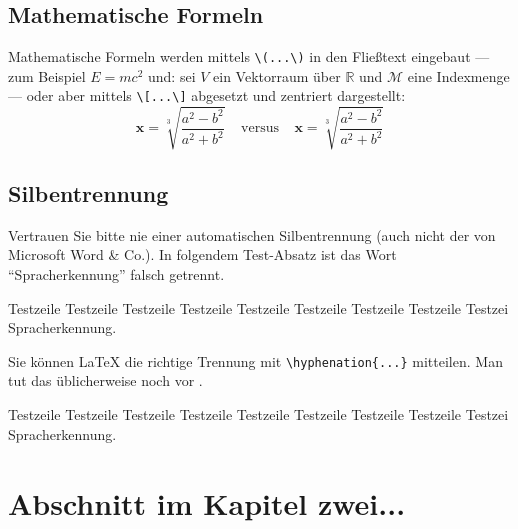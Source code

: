 \subsection{Mathematische Formeln}

Mathematische Formeln werden mittels \verb|\(...\)|
in den Fließtext eingebaut
--- zum Beispiel \( E=mc^2 \) und:
sei \(V\) ein Vektorraum über \(\mathbb{R}\)
und \(\mathcal{M}\) eine Indexmenge
---
oder aber mittels \verb|\[...\]|
abgesetzt und zentriert dargestellt:
	\[
	\pmb{x} = \sqrt[3]{\frac{a^2-b^2}{a^2+b^2}}
		~~~~~ \text{versus} ~~~~~
	\boldsymbol{x} = \sqrt[3]{\frac{a^2-b^2}{a^2+b^2}}
	\]


\subsection{Silbentrennung}
Vertrauen Sie bitte nie einer automatischen Silbentrennung (auch nicht der von Microsoft Word \& Co.). In folgendem Test-Absatz ist das Wort "`Spracherkennung"' falsch getrennt.

Testzeile Testzeile Testzeile Testzeile Testzeile Testzeile Testzeile Testzeile Testzei Spracherkennung.

Sie können LaTeX die richtige Trennung mit \verb|\hyphenation{...}| mitteilen. Man tut das üblicherweise noch vor \verb||.

Testzeile Testzeile Testzeile Testzeile Testzeile Testzeile Testzeile Testzeile Testzei Spracherkennung.



\section{Abschnitt im Kapitel zwei...}